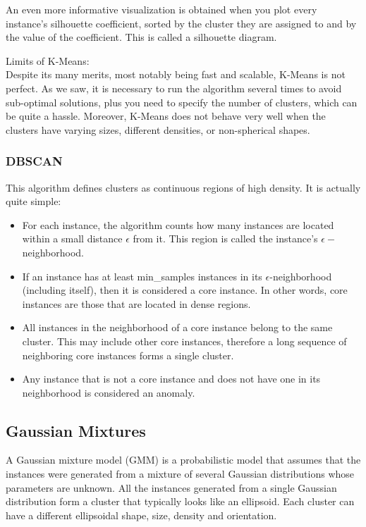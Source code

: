 \documentclass[french]{article}
\begin{document}
An even more informative visualization is obtained when you plot every instance’s silhouette coefficient, sorted by the cluster they are assigned to and by the value of the coefficient. This is called a silhouette diagram.

Limits of K-Means:\\
Despite its many merits, most notably being fast and scalable, K-Means is not perfect.  As we saw, it is necessary to run the algorithm several times to avoid sub-optimal solutions, plus you need to specify the number of clusters, which can be quite a hassle.  Moreover, K-Means does not behave very well when the clusters have varying sizes, different densities, or non-spherical shapes.

\subsubsection{DBSCAN}

This algorithm defines clusters as continuous regions of high density. It is actually quite simple:

\begin{itemize}
    \item For each instance, the algorithm counts how many instances are located within a small distance $\epsilon$ from it. This region is called the instance’s $\epsilon -$ neighborhood.
    \item If an instance has at least min\_samples instances in its $\epsilon$-neighborhood (including itself), then it is considered a core instance. In other words, core instances are those that are located in dense regions.
    \item All instances in the neighborhood of a core instance belong to the same cluster.  This may include other core instances, therefore a long sequence of neighboring core instances forms a single cluster.
    \item Any instance that is not a core instance and does not have one in its neighborhood is considered an anomaly.
\end{itemize}

\subsection{Gaussian Mixtures}

A Gaussian mixture model (GMM) is a probabilistic model that assumes that the instances were generated from a mixture of several Gaussian distributions whose parameters are unknown. All the instances generated from a single Gaussian distribution form a cluster that typically looks like an ellipsoid. Each cluster can have a different ellipsoidal shape, size, density and orientation.\\
\end{document}
